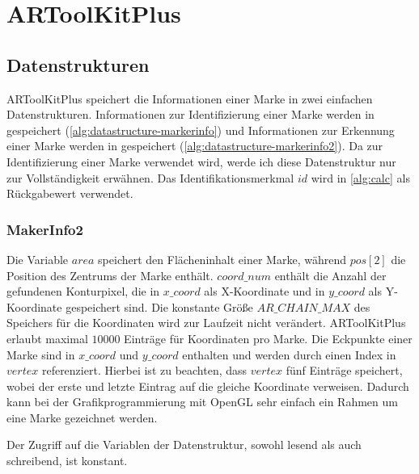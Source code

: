 \section{ARToolKitPlus} %
\label{sec:artoolkitplus}

\subsection{Datenstrukturen} %
\label{sec:datenstrukturen}

ARToolKitPlus speichert die Informationen einer Marke in zwei einfachen Datenstrukturen. Informationen zur
 Identifizierung einer Marke werden in  gespeichert (\autoref{alg:datastructure-markerinfo}) und
 Informationen zur Erkennung einer Marke werden in  gespeichert
 (\autoref{alg:datastructure-markerinfo2}). Da  zur Identifizierung einer Marke verwendet wird,
 werde ich diese Datenstruktur nur zur Vollständigkeit erwähnen. Das Identifikationsmerkmal $\mathit{id}$ wird in
 \autoref{alg:calc} als Rückgabewert verwendet.



\subsubsection{MakerInfo2} %
\label{sec:makerinfo2}

Die Variable $\mathit{area}$ speichert den Flächeninhalt einer Marke, während $\mathit{pos}[2]$ die Position des
 Zentrums der Marke enthält. $\mathit{coord\_num}$ enthält die Anzahl der gefundenen Konturpixel, die in
 $\mathit{x\_coord}$ als X-Koordinate und in $\mathit{y\_coord}$ als Y-Koordinate gespeichert sind. Die konstante Größe
 $\mathit{AR\_CHAIN\_MAX}$ des Speichers für die Koordinaten wird zur Laufzeit nicht verändert. ARToolKitPlus erlaubt
 maximal $10000$ Einträge für Koordinaten pro Marke. Die Eckpunkte einer Marke sind in $\mathit{x\_coord}$ und
 $\mathit{y\_coord}$ enthalten und werden durch einen Index in $\mathit{vertex}$ referenziert. Hierbei ist zu beachten,
 dass $\mathit{vertex}$ fünf Einträge speichert, wobei der erste und letzte Eintrag auf die gleiche Koordinate
 verweisen. Dadurch kann bei der Grafikprogrammierung mit OpenGL sehr einfach ein Rahmen um eine Marke gezeichnet
 werden.



Der Zugriff auf die Variablen der Datenstruktur, sowohl lesend als auch schreibend, ist konstant.

